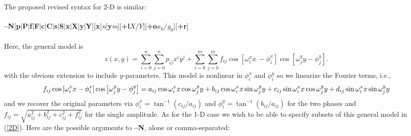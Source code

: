 \documentclass[12pt,letterpaper,margin=0.5in]{report}
\begin{document}
The proposed revised syntax for 2-D is similar:
\\ \\
{\bf --N}[{\bf p}$|${\bf P}$|${\bf f}$|${\bf F}$|${\bf c}$|${\bf C}$|${\bf s}$|${\bf S}$|${\bf x}$|${\bf X}$|${\bf y}$|${\bf Y}][{\bf x}]{\it n}[{\bf y}{\it m}][{\bf +l}$X/Y$][{\bf +o}$x_0/y_0$][{\bf +r}]
\\ \\
Here, the general model is
\begin{equation}
z(x,y) = \sum_{i = 0}^n \sum_{j = 0}^n p_{ij} x^iy^j + \sum_{i = 0}^m \sum_{j = 0}^m f_{ij} \cos \left [\omega_i^x x \
	- \phi_i^x \right ] \cos \left [\omega_j^y y - \phi_j^y \right ] .
\label{2D}
\end{equation}
with the obvious extension to include $y$-parameters.
This model is nonlinear in $\phi_i^x$ and $\phi_i^y$ so we linearize the Fourier terms, i.e.,
\begin{dmath}
f_{ij} \cos \left [\omega_i^x x- \phi_i^x \right ] \cos \left [\omega_j^y y - \phi_j^y \right ] =
a_{ij} \cos \omega_i^x x \cos \omega_j^y y + b_{ij} \cos \omega_i^x x \sin \omega_j^y y + \\
c_{ij} \sin \omega_i^x x \cos \omega_j^y y + d_{ij} \sin \omega_i^x x \sin \omega_j^y y
\end{dmath}
and we recover the original parameters via $\phi_i^x = \tan^{-1}(c_{ij}/a_{ij})$ and $\phi_i^y = \tan^{-1}(b_{ij}/a_{ij})$
for the two phases and $f_{ij} = \sqrt{a_{ij}^2 + b_{ij}^2 + c_{ij}^2 + f_{ij}^2}$ for the single amplitude.
As for the 1-D case
we wish to be able to specify subsets of this general model in (\ref{2D}).  Here are the possible arguments to {\bf --N}, alone or comma-separated:
\end{document}
